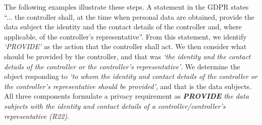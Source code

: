
The following examples illustrate these steps. A statement in the GDPR states ``... the controller shall, at the time when personal data are obtained, provide the data subject the identity and the contact details of the controller and, where applicable, of the controller's representative''. From this statement, we identify \textit{`PROVIDE'} as the action that the controller shall act. We then consider what should be provided by the controller, and that was \textit{`the identity and the contact details of the controller or the controller's representative'}. We determine the object responding to \textit{`to whom the identity and contact details of the controller or the controller's representative should be provided'}, and that is the data subjects. All three components formulate a privacy requirement as \textit{\textbf{PROVIDE} the data subjects with the identity and contact details of a controller/controller's representative (R22)}.

